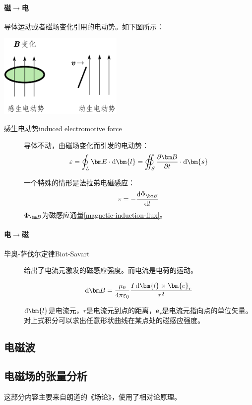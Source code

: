 \paragraph*{磁$\rightarrow$电}导体运动或者磁场变化引用的电动势。如下图所示：

\begin{center}
\includegraphics[width=6cm]{figure/magnetic-to-current.png}
\end{center}

\begin{description}
\item[感生电动势induced electromotive force] 导体不动，由磁场变化而引发的电动势：
$$\varepsilon =\oint_L\bE\cdot\dif\bm{l}=\oiint_S \pdv{\bB}{t}\cdot\dif \bm{s}$$

一个特殊的情形是法拉弟电磁感应：
$$\varepsilon=-\odv{\Phi_{\bB}}{t}$$
$\Phi_{\bB}$为磁感应通量\ref{magnetic-induction-flux}。
\end{description}


\paragraph*{电$\rightarrow$磁}
\begin{description}
\item[毕奥-萨伐尔定律Biot-Savart]给出了电流元激发的磁感应强度。而电流是电荷的运动。

$$\dif \bB=\frac{\mu_0}{4\pi\varepsilon_0}\frac{I\dif \bm{l}\times \bm{e}_r}{r^2}$$

$\dif\bm{l}$是电流元，$r$是电流元到点的距离，$\bm{e}_r$是电流元指向点的单位矢量。对上式积分可以求出任意形状曲线在某点处的磁感应强度。
\end{description}

\subsection{电磁波}

\subsection{电磁场的张量分析}
这部分内容主要来自朗道的《场论》，使用了相对论原理。


